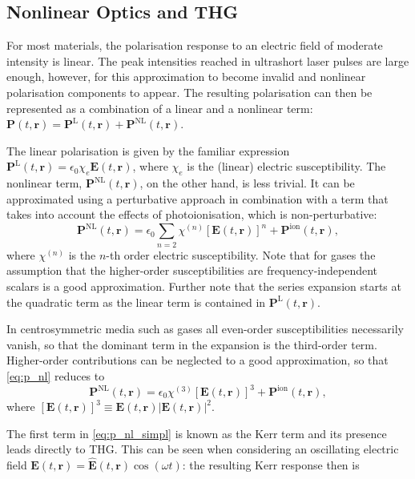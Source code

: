 \documentclass[a4paper]{jpconf}
\begin{document}
\subsection{Nonlinear Optics and THG}
For most materials, the polarisation response to an electric field of moderate intensity is linear. The peak intensities reached in ultrashort laser pulses are large enough, however, for this approximation to become invalid and nonlinear polarisation components to appear. The resulting polarisation can then be represented as a combination of a linear and a nonlinear term: $\mathbf{P}(t, \mathbf{r}) = \mathbf{P}^\text{L}(t, \mathbf{r}) + \mathbf{P}^\text{NL}(t, \mathbf{r})$. \par 
The linear polarisation is given by the familiar expression $\mathbf{P}^\text{L}(t, \mathbf{r}) = \epsilon_0 \chi_e \mathbf{E}(t, \mathbf{r})$, where $\chi_e$ is the (linear) electric susceptibility. The nonlinear term, $\mathbf{P}^\text{NL}(t, \mathbf{r})$, on the other hand, is less trivial. It can be approximated using a perturbative approach in combination with a term that takes into account the effects of photoionisation, which is non-perturbative:
\begin{equation}\label{eq:p_nl}
\mathbf{P}^\text{NL}(t, \mathbf{r}) = \epsilon_0 \sum_{n=2} \chi^{(n)} [\mathbf{E}(t, \mathbf{r})]^n + \mathbf{P}^\text{ion}(t, \mathbf{r}),
\end{equation}
where $\chi^{(n)}$ is the $n$-th order electric susceptibility. Note that for gases the assumption that the higher-order susceptibilities are frequency-independent scalars is a good approximation. Further note that the series expansion starts at the quadratic term as the linear term is contained in $\mathbf{P}^\text{L}(t, \mathbf{r})$.  \par 
In centrosymmetric media such as gases all even-order susceptibilities necessarily vanish, so that the dominant term in the expansion is the third-order term. Higher-order contributions can be neglected to a good approximation, so that \eqref{eq:p_nl} reduces to
\begin{equation}\label{eq:p_nl_simpl}
\mathbf{P}^\text{NL}(t, \mathbf{r}) = \epsilon_0 \chi^{(3)} [\mathbf{E}(t, \mathbf{r})]^3 + \mathbf{P}^\text{ion}(t, \mathbf{r}),
\end{equation}
where $[\mathbf{E}(t, \mathbf{r})]^3 \equiv \mathbf{E}(t, \mathbf{r}) |\mathbf{E}(t, \mathbf{r})|^2$. \par 
The first term in \eqref{eq:p_nl_simpl} is known as the Kerr term and its presence leads directly to THG. This can be seen when considering an oscillating electric field $\mathbf{E}(t, \mathbf{r}) = \hat{\mathbf{E}}(t, \mathbf{r})\cos(\omega t)$: the resulting Kerr response then is 
\end{document}
